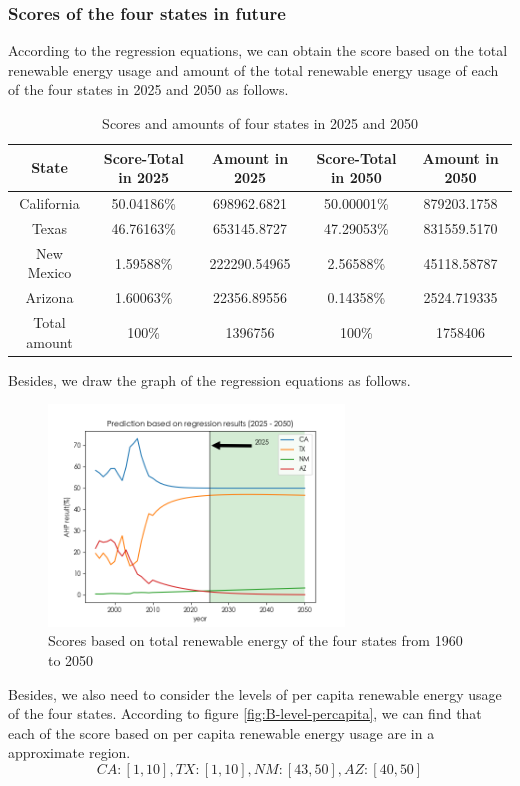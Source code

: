 \documentclass[a4paper,11pt]{article}
\begin{document}
\subsubsection{Scores of the four states in future}
\par According to the regression equations, we can obtain the score based on the total renewable energy usage and amount of the total renewable energy usage of each of the four states in 2025 and 2050 as follows.
\begin{table}[!hbp]
    \centering 
    \begin{tabular}{|c|c|c|c|c|}
\hline
State & Score-Total in 2025 & Amount in 2025 & Score-Total in 2050 & Amount in 2050\\
\hline
California & 50.04186\% & 698962.6821 & 50.00001\% & 879203.1758 \\
\hline
Texas & 46.76163\% & 653145.8727 & 47.29053\% & 831559.5170 \\
\hline
New Mexico & 1.59588\% & 222290.54965 & 2.56588\% & 45118.58787 \\
\hline
Arizona & 1.60063\% & 22356.89556 & 0.14358\% &2524.719335 \\
\hline
Total amount & 100\% & 1396756 & 100\% & 1758406 \\
\hline
\end{tabular}
\caption{Scores and amounts of four states in 2025 and 2050}
\label{tab:Scores and amounts}
\end{table}
\par Besides, we draw the graph of the regression equations as follows.
\begin{figure}[h]%
    \centering 
    \includegraphics[width=0.7\textwidth]{./Pic/D-scores.png}
    \caption{Scores based on total renewable energy of the four states from 1960 to 2050}
    \label{fig:D-scores}  
\end{figure}
\par Besides, we also need to consider the levels of per capita renewable energy usage of the four states. According to figure \ref{fig:B-level-percapita}, we can find that each of the score based on per capita renewable energy usage are in a approximate region.
\[
CA:[1,10], TX:[1,10], NM:[43,50], AZ:[40,50]
\]
\end{document}
